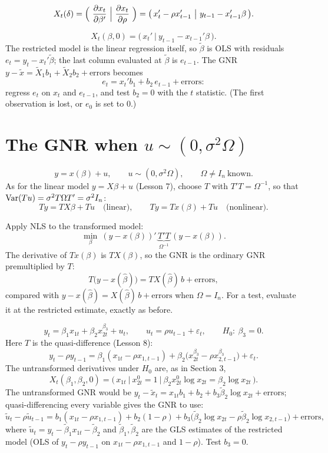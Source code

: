 \documentclass[11pt]{article}
\begin{document}
\[ X_{t}(\delta)=\Bigl(\ \frac{\partial x_{t}}{\partial\beta'}\ \Big|\
                       \frac{\partial x_{t}}{\partial\rho}\ \Bigr)
   =\bigl(\,x_{t}'-\rho x_{t-1}'\ \big|\ y_{t-1}-x_{t-1}'\beta\,\bigr). \]

\[ X_{t}(\beta,0)=\bigl(\,x_{t}'\ \big|\ y_{t-1}-x_{t-1}'\beta\,\bigr). \]
The restricted model is the linear regression itself, so $\tilde\beta$ is OLS with
residuals $e_{t}=y_{t}-x_{t}'\tilde\beta$; the last column evaluated at $\tilde\beta$
is $e_{t-1}$. The GNR $y-\tilde x=\tilde X_{1}b_{1}+\tilde X_{2}b_{2}+\text{errors}$ becomes
\[ e_{t}=x_{t}'b_{1}+b_{2}\,e_{t-1}+\text{errors}: \]
regress $e_{t}$ on $x_{t}$ and $e_{t-1}$, and test $b_{2}=0$ with the $t$ statistic.
(The first observation is lost, or $e_{0}$ is set to $0$.)

\section{The GNR when $u\sim(0,\sigma^{2}\Omega)$}

\[ y=x(\beta)+u, \qquad u\sim(0,\sigma^{2}\Omega), \qquad \Omega\neq I_{n}\ \text{known}. \]
As for the linear model $y=X\beta+u$ (Lesson 7), choose $T$ with
$T'T=\Omega^{-1}$, so that $\operatorname{Var}(Tu)=\sigma^{2}T\Omega T'=\sigma^{2}I_{n}$:
\[ Ty=TX\beta+Tu \quad\text{(linear)}, \qquad
   Ty=Tx(\beta)+Tu \quad\text{(nonlinear)}. \]

Apply NLS to the transformed model:
\[ \min_{\beta}\ (y-x(\beta))'\,\underbrace{T'T}_{\Omega^{-1}}\,(y-x(\beta)). \]
The derivative of $Tx(\beta)$ is $TX(\beta)$, so the GNR is the ordinary GNR
premultiplied by $T$:
\[ T\bigl(y-x(\hat\beta)\bigr)=TX(\hat\beta)\,b+\text{errors}, \]
compared with $y-x(\hat\beta)=X(\hat\beta)\,b+\text{errors}$ when $\Omega=I_{n}$.
For a test, evaluate it at the restricted estimate, exactly as before.

\[ y_{t}=\beta_{1}x_{1t}+\beta_{2}x_{2t}^{\beta_{3}}+u_{t}, \qquad
   u_{t}=\rho u_{t-1}+\varepsilon_{t}, \qquad H_{0}:\ \beta_{3}=0. \]
Here $T$ is the quasi-difference (Lesson 8):
\[ y_{t}-\rho y_{t-1}=\beta_{1}(x_{1t}-\rho x_{1,t-1})
   +\beta_{2}\bigl(x_{2t}^{\beta_{3}}-\rho x_{2,t-1}^{\beta_{3}}\bigr)+\varepsilon_{t}. \]
The untransformed derivatives under $H_{0}$ are, as in Section 3,
\[ X_{t}(\beta_{1},\beta_{2},0)=\bigl(\,x_{1t}\ \big|\ x_{2t}^{0}=1\ \big|\
   \beta_{2}x_{2t}^{0}\log x_{2t}=\beta_{2}\log x_{2t}\,\bigr). \]
The untransformed GNR would be
$y_{t}-\tilde x_{t}=x_{1t}b_{1}+b_{2}+b_{3}\tilde\beta_{2}\log x_{2t}+\text{errors}$;
quasi-differencing every variable gives the GNR to use:
\[ \tilde u_{t}-\rho\tilde u_{t-1}
   =b_{1}(x_{1t}-\rho x_{1,t-1})+b_{2}(1-\rho)
    +b_{3}\bigl(\tilde\beta_{2}\log x_{2t}-\rho\tilde\beta_{2}\log x_{2,t-1}\bigr)
    +\text{errors}, \]
where $\tilde u_{t}=y_{t}-\tilde\beta_{1}x_{1t}-\tilde\beta_{2}$ and
$\tilde\beta_{1},\tilde\beta_{2}$ are the GLS estimates of the restricted model
(OLS of $y_{t}-\rho y_{t-1}$ on $x_{1t}-\rho x_{1,t-1}$ and $1-\rho$). Test $b_{3}=0$.
\end{document}
